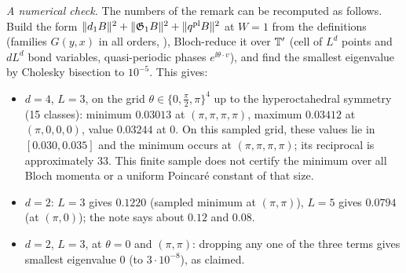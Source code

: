 \begin{detail}\label{d7:bloch}
\emph{A numerical check.} The numbers of the remark can be recomputed as follows. Build the form $\|d_1 B\|^2+\|\mathfrak G_1B\|^2+\|q^{\rm pl}B\|^2$ at $W=1$ from the definitions (families $G(y,x)$ in all orders, ), Bloch-reduce it over $\mathbb T'$ (cell of $L^d$ points and $dL^d$ bond variables, quasi-periodic phases $e^{\ii\theta\cdot v}$), and find the smallest eigenvalue by Cholesky bisection to $10^{-5}$. This gives:
\begin{itemize}
\item $d=4$, $L=3$, on the grid $\theta\in\{0,\frac\pi2,\pi\}^4$ up to the hyperoctahedral symmetry (15 classes): minimum $0.03013$ at $(\pi,\pi,\pi,\pi)$, maximum $0.03412$ at $(\pi,0,0,0)$, value $0.03244$ at $0$. On this sampled grid, these values lie in $[0.030,0.035]$ and the minimum occurs at $(\pi,\pi,\pi,\pi)$; its reciprocal is approximately $33$. This finite sample does not certify the minimum over all Bloch momenta or a uniform Poincar\'e constant of that size.
\item $d=2$: $L=3$ gives $0.1220$ (sampled minimum at $(\pi,\pi)$), $L=5$ gives $0.0794$ (at $(\pi,0)$); the note says about $0.12$ and $0.08$.
\item $d=2$, $L=3$, at $\theta=0$ and $(\pi,\pi)$: dropping any one of the three terms gives smallest eigenvalue $0$ (to $3\cdot10^{-8}$), as claimed.
\end{itemize}
\end{detail}

